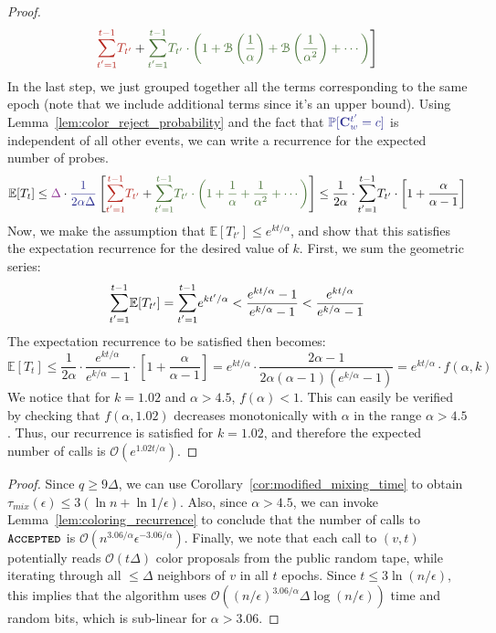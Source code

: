 \begin{proof}
\begin{align}
\textcolor{BrickRed}{\mathlarger\sum\limits_{t'=1}^{t-1} T_{t'}} +
\textcolor{OliveGreen!80!black}{\mathlarger\sum\limits_{t'=1}^{t-1} T_{t'}\cdot
\left(1 + \mathcal B\left(\frac1\alpha\right) + \mathcal B\left(\frac1{\alpha^2}\right) + \cdots\right)}
\Biggr]
\end{align}
In the last step, we just grouped together all the terms corresponding to the same epoch
(note that we include additional terms since it's an upper bound).
Using Lemma~\ref{lem:color_reject_probability} and the fact that $\textcolor{Blue}{\mathbb P[\vec C^{t'}_w = c]}$ is independent of all other events,
we can write a recurrence for the expected number of probes.
\begin{align}
\mathbb E[T_t] \le \textcolor{Fuchsia}{\Delta} \cdot \textcolor{Blue}{\frac{1}{2\alpha\Delta}}
\left[
\textcolor{BrickRed}{\mathlarger\sum\limits_{t'=1}^{t-1} T_{t'}} +
\textcolor{OliveGreen!80!black}{\mathlarger\sum\limits_{t'=1}^{t-1} T_{t'}\cdot \left(1 + \frac1\alpha + \frac1{\alpha^2} + \cdots\right)}
\right]
\le \frac{1}{2\alpha}\cdot \mathlarger\sum\limits_{t'=1}^{t-1} T_{t'}\cdot \left[1 + \frac{\alpha}{\alpha-1} \right]
\end{align}
Now, we make the assumption that $\mathbb E[T_{t'}]\le e^{k t/\alpha}$,
and show that this satisfies the expectation recurrence for the desired value of $k$.
First, we sum the geometric series:
\[
\mathlarger\sum\limits_{t'=1}^{t-1} \mathbb E[T_{t'}] = \mathlarger\sum\limits_{t'=1}^{t-1} e^{k t'/\alpha}
< \frac{e^{k t/\alpha}-1}{e^{k/\alpha}-1} < \frac{e^{k t/\alpha}}{e^{k/\alpha}-1}
\]
The expectation recurrence to be satisfied then becomes:
\[
\mathbb E[T_t]\le \frac 1{2\alpha}\cdot \frac{e^{k t/\alpha}}{e^{k/\alpha}-1}\cdot \left[ 1+ \frac{\alpha}{\alpha-1} \right]
= e^{k t/\alpha}\cdot \frac{2\alpha-1}{2\alpha(\alpha-1)(e^{k/\alpha}-1)} = e^{k t/\alpha}\cdot f(\alpha, k)
\]
We notice that for $k=1.02$ and $\alpha > 4.5$, $f(\alpha) < 1$.
This can easily be verified by checking that $f(\alpha,1.02)$ decreases monotonically with $\alpha$ in the range $\alpha > 4.5$.
Thus, our recurrence is satisfied for $k=1.02$, and therefore the expected number of calls is $\mathcal O(e^{1.02t/\alpha})$.
\end{proof}

\ColoringGrand*
\begin{proof}
Since $q\ge 9\Delta$, we can use Corollary~\ref{cor:modified_mixing_time} to obtain $\tau_{mix}(\epsilon) \le 3(\ln n + \ln 1/\epsilon)$.
Also, since $\alpha > 4.5$, we can invoke Lemma~\ref{lem:coloring_recurrence} to conclude that
the number of calls to $\texttt{\textsc{Accepted}}$ is $\mathcal O(n^{3.06/\alpha}\epsilon^{-3.06/\alpha})$.
Finally, we note that each call to $(v,t)$ potentially reads $\mathcal O(t\Delta)$ color proposals from the public random tape,
while iterating through all $\le \Delta$ neighbors of $v$ in all $t$ epochs.
Since $t \le 3\ln (n/\epsilon)$, this implies that the algorithm uses
$\mathcal O((n/\epsilon)^{3.06/\alpha}\Delta\log (n/\epsilon))$ time and random bits, which is sub-linear for $\alpha > 3.06$.
\end{proof}

